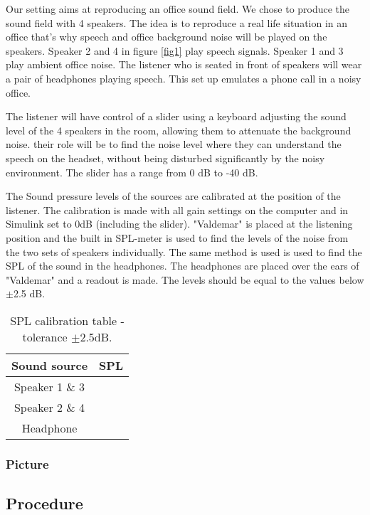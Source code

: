 Our setting aims at reproducing an office sound field. We chose to produce the sound field with 4 speakers. 
The idea is to reproduce a real life situation in an office that's why speech and office background noise will be played on the speakers. Speaker 2 and 4 in figure \ref{fig1} play speech signals. Speaker 1 and 3 play ambient office noise. 
The listener who is seated in front of speakers will wear a pair of headphones playing speech. This set up emulates a phone call in a noisy office.

The listener will have control of a slider using a keyboard adjusting the sound level of the 4 speakers in the room, allowing them to attenuate the background noise. their role will be to find the noise level where they can understand the speech on the headset, without being disturbed significantly by the noisy environment. The slider has a range from 0 dB to -40 dB. 

The Sound pressure levels of the sources are calibrated at the position of the listener. The calibration is made with all gain settings on the computer and in Simulink set to 0dB (including the slider). "Valdemar" is placed at the listening position and the built in SPL-meter is used to find the levels of the noise from the two sets of speakers individually. 
The same method is used is used to find the SPL of the sound in the headphones. The headphones are placed over the ears of "Valdemar" and a readout is made. The levels should be equal to the values below $\pm$2.5 dB. \\
\begin{table} [H]
\centering
	\begin{tabular}{c c}			\toprule
		Sound source	& SPL	\\ 	\bottomrule
		Speaker 1 \& 3	&		\\
		Speaker 2 \& 4	&		\\
		Headphone		&		\\ \bottomrule
	\end{tabular}
	\caption{SPL calibration table - tolerance $\pm$2.5dB.}
	\label{tab:SPLCalibration}
\end{table}   

\subsubsection{Picture}
\vspace{1cm}
\subsection{Procedure}

